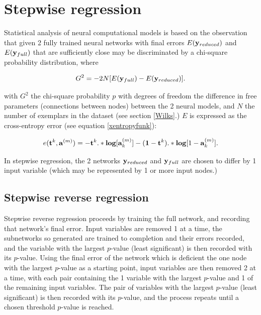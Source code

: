 \documentclass{report}
\newcounter{figcount}
\begin{document}
\chapter{Stepwise regression}\label{regresschap}
\setcounter{figcount}{1}

Statistical analysis of neural computational models is based on the
observation that given 2 fully trained neural networks with final
errors $E({\bf y}_{reduced})$ and $E({\bf y}_{full})$ that are
sufficiently close may be discriminated by a chi-square probability
distribution, where

\begin{displaymath}
G^2 = -2N [E({\bf y}_{full}) - E({\bf y}_{reduced})].
\end{displaymath}

with $G^2$ the chi-square probability $p$ with degrees of freedom the
difference in free parameters (connections between nodes) between the
2 neural models, and $N$ the number of exemplars in the dataset (see
section \ref{Wilks}.)  $E$ is expressed as the cross-entropy error
(see equation \ref{xentropyfunk}):

\begin{equation}
e({\bf t}^k, {\bf a}^{(m)}) =
-{\bf t}^k .* {\bf log} [{\bf a}^{(m)}_k] - ({\bf 1} - {\bf t}^k) .*
{\bf log} [1 - {\bf a}^{(m)}_k].
\end{equation}

In stepwise regression, the 2 networks ${\bf y}_{reduced}$ and
${\bf y}_{full}$ are chosen to differ by 1 input variable (which may
be represented by 1 or more input nodes.)

\section{Stepwise reverse regression}\label{revreg}

Stepwise reverse regression proceeds by training the full network, and
recording that network's final error.  Input variables are removed 1
at a time, the subnetworks so generated are trained to completion and
their errors recorded, and the variable with the largest $p$-value
(least significant) is then recorded with its $p$-value.  Using the
final error of the network which is deficient the one node with the
largest $p$-value as a starting point, input variables are then
removed 2 at a time, with each pair containing the 1 variable with the
largest $p$-value and 1 of the remaining input variables.  The pair of
variables with the largest $p$-value (least significant) is then
recorded with its $p$-value, and the process repeats until a chosen
threshold $p$-value is reached.
\end{document}
